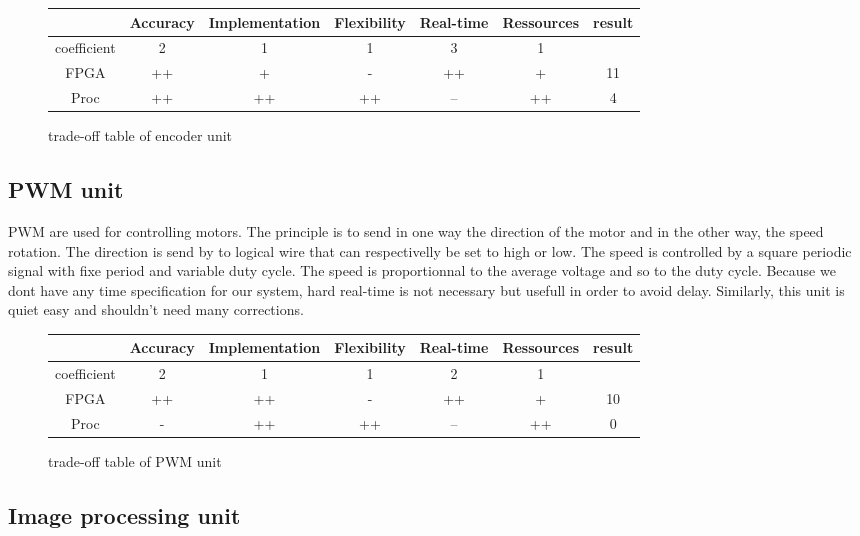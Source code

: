 \begin{figure}[!ht]
\begin{tabular}{|c|c|c|c|c|c|c|}\hline
                         & Accuracy  & Implementation & Flexibility & Real-time & Ressources & result \\\hline
coefficient   &         2          &           1                      &         1           &           3         &           1            &              \\\hline
FPGA            &      ++          &            +                    &         -           &        ++         &           +           &    11        \\\hline
Proc               &      ++         &              ++                &         ++       &         --          &           ++        &   4 \\\hline
\end{tabular}
\caption{trade-off table of encoder unit}
\end{figure}

\subsection{PWM unit}

PWM are used for controlling motors. The principle is to send in one way the direction of the motor and in the other way, the speed rotation. The direction is send by to logical wire that can respectivelly be set to high or low. The speed is controlled by a square periodic signal with fixe period and variable duty cycle. The speed is proportionnal to the average voltage and so to the duty cycle. Because we dont have any time specification for our system, hard real-time is not necessary but usefull in order to avoid delay. Similarly, this unit is quiet easy and shouldn't need many corrections. 

\begin{figure}[!ht]
\begin{tabular}{|c|c|c|c|c|c|c|}\hline
                         & Accuracy  & Implementation & Flexibility & Real-time & Ressources & result \\\hline
coefficient   &         2          &           1                      &         1           &           2         &         1               &             \\\hline
FPGA            &      ++          &            ++                 &         -           &        ++         &         +              &   10     \\\hline
Proc               &      -             &              ++               &         ++       &         --          &          ++          &       0    \\\hline
\end{tabular}
\caption{trade-off table of PWM unit}
\end{figure}

\subsection{Image processing unit}

